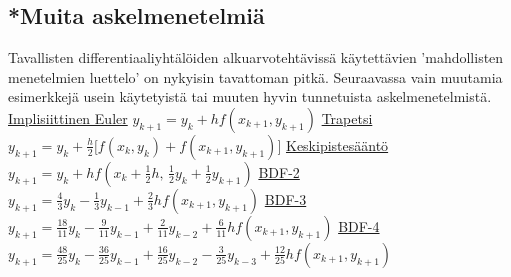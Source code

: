 \subsection*{*Muita askelmenetelmiä}

Tavallisten differentiaaliyhtälöiden alkuarvotehtävissä käytettävien 'mahdollisten menetelmien
luettelo' on nykyisin tavattoman pitkä. Seuraavassa vain muutamia esimerkkejä usein käytetyistä
tai muuten hyvin tunnetuista askelmenetelmistä.
  
\vspace{5mm}\newline
\underline{Implisiittinen Euler} \vspace{2mm}\newline
$y_{k+1}=y_k+hf(x_{k+1},y_{k+1})$ \vspace{5mm}\newline
\underline{Trapetsi} \vspace{2mm}\newline
$y_{k+1}=y_k+\frac{h}{2}\bigl[f(x_k,y_k)+f(x_{k+1},y_{k+1})\bigr]$ \vspace{5mm}\newline
\underline{Keskipistesääntö} \vspace{2mm}\newline
$y_{k+1}=y_k+hf\left(x_k+\frac{1}{2}h,\,\frac{1}{2}y_k+\frac{1}{2}y_{k+1}\right)$
\vspace{5mm}\newline
\underline{BDF-2} \vspace{2mm}\newline
$y_{k+1}=\frac{4}{3}y_k-\frac{1}{3}y_{k-1}+\frac{2}{3}hf(x_{k+1},y_{k+1})$ \vspace{5mm}\newline
\underline{BDF-3} \vspace{2mm}\newline
$y_{k+1}=\frac{18}{11}y_k-\frac{9}{11}y_{k-1}+\frac{2}{11}y_{k-2}
                         +\frac{6}{11}hf(x_{k+1},y_{k+1})$ \vspace{5mm}\newline
\underline{BDF-4} \vspace{2mm}\newline
$y_{k+1}=\frac{48}{25}y_k-\frac{36}{25}y_{k-1}+\frac{16}{25}y_{k-2}-\frac{3}{25}y_{k-3}
                         +\frac{12}{25}hf(x_{k+1},y_{k+1})$ \vspace{5mm}\newline
